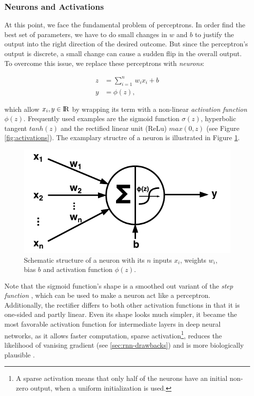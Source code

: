 \subsubsection{Neurons and Activations}

At this point, we face the fundamental problem of perceptrons. In order find the best set of parameters, we have to do small changes in $ w $ and $ b $ to justify the output into the right direction of the desired outcome. But since the perceptron's output is discrete, a small change can cause a sudden flip in the overall output. To overcome this issue, we replace these perceptrons with \textit{neurons}:

\begin{equation}
\begin{aligned}
z &= \sum\limits_{i=1}^n \, w_{i}x_{i} + b \\
y &= \phi(z) ,
\end{aligned}
\end{equation}

which allow $ x_{i}, y \in \rm I\!R $ by wrapping its term with a non-linear \textit{activation function} $ \phi(z) $. Frequently used examples are the sigmoid function $ \sigma(z) $, hyperbolic tangent $ tanh(z) $ and the rectified linear unit (ReLu) $ max(0, z) $ (see Figure \ref{fig:activations}). The examplary structre of a neuron is illustrated in Figure \ref{fig:neuron}.

\begin{figure}[htpb]
	\centering
	\includegraphics[scale=0.6]{figures/neuron.pdf}
	\caption[Schematic neuron]{Schematic structure of a neuron with its $ n $ inputs $x_{i}$, weights $w_{i}$, bias $ b $ and activation function $\phi(z)$.} \label{fig:neuron}
\end{figure}

Note that the sigmoid function's shape is a smoothed out variant of the \textit{step function} \parencite{neural_nets_deep_learning}, which can be used to make a neuron act like a perceptron. Additionally, the rectifier differs to both other activation functions in that it is one-sided and partly linear. Even its shape looks much simpler, it became the most favorable activation function for intermediate layers in deep neural networks, as it allows faster computation, sparse activation\footnote{{A sparse activation means that only half of the neurons have an initial non-zero output, when a uniform initialization is used.}}, reduces the likelihood of vanising gradient (see \ref{sec:rnn-drawbacks}) and is more biologically plausible \parencite{relu}.

